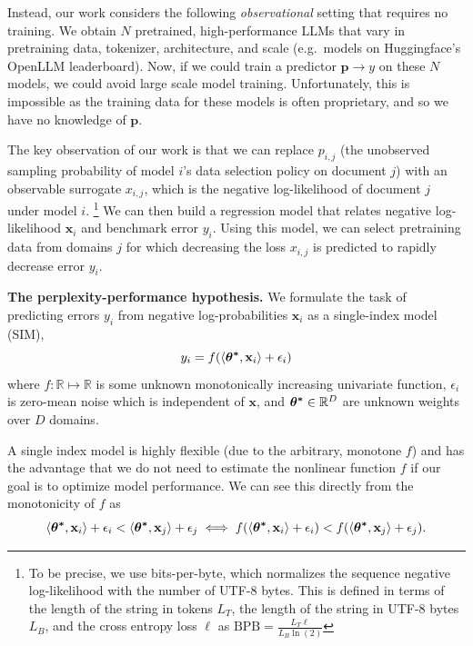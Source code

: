 \documentclass{article} %
\begin{document}
Instead, our work considers the following \emph{observational} setting that requires no training. We obtain $N$ pretrained, high-performance LLMs that vary in pretraining data, tokenizer, architecture, and scale (e.g.\ models on Huggingface's OpenLLM leaderboard). Now, if we could train a predictor $\mathbf{p} \to y$ on these $N$ models, we could avoid large scale model training. Unfortunately, this is impossible as the training data for these models is often proprietary, and so we have no knowledge of $\mathbf{p}$. 

The key observation of our work is that we can replace $p_{i,j}$ (the unobserved sampling probability of model $i$'s data selection policy on document $j$) with an observable  surrogate $x_{i,j}$, which is the negative log-likelihood of document $j$ under model $i$.%
\footnote{\label{fn:bpb}To be precise, we use bits-per-byte, which normalizes the sequence negative log-likelihood with the number of UTF-8 bytes. This is defined in terms of the length of the string in tokens $L_T$, the length of the string in UTF-8 bytes $L_B$, and the cross entropy loss $\ell$ as $\text{BPB} = \frac{L_T\ell}{L_B\ln(2)}$} We can then build a regression model that relates negative log-likelihood $\mathbf{x}_i$ and benchmark error $y_i$. Using this model, we can select pretraining data from domains $j$ for which decreasing the loss $x_{i,j}$ is predicted to rapidly decrease error $y_i$.

\label{hypothesis}
\noindent\textbf{The perplexity-performance hypothesis.} We formulate the task of predicting errors $y_i$ from negative log-probabilities $\mathbf{x}_i$ as a single-index model (SIM),
\begin{equation}
\label{sim}
y_i = f(\langle \bm{{\bf{\theta}^*}},\mathbf{x}_i\rangle + \epsilon_i)
\end{equation}
where $f: \mathbb{R} \mapsto \mathbb{R}$ is some unknown monotonically increasing univariate function, $\epsilon_i$ is zero-mean noise which is independent of $\mathbf{x}$, and $\bm{{\bf{\theta}^*}} \in \mathbb{R}^D$ are unknown weights over $D$ domains.

A single index model is highly flexible (due to the arbitrary, monotone $f$) and has the advantage that we do not need to estimate the nonlinear function $f$ if our goal is to optimize model performance. We can see this directly from the monotonicity of $f$ as
\begin{equation}
\langle\bm{{\bf{\theta}^*}},\mathbf{x}_i\rangle + \epsilon_i < \langle\bm{{\bf{\theta}^*}},\mathbf{x}_j\rangle + \epsilon_j
\iff
f(\langle\bm{{\bf{\theta}^*}},\mathbf{x}_i\rangle + \epsilon_i) < 
f(\langle\bm{{\bf{\theta}^*}},\mathbf{x}_j\rangle + \epsilon_j).
\end{equation}
\end{document}
